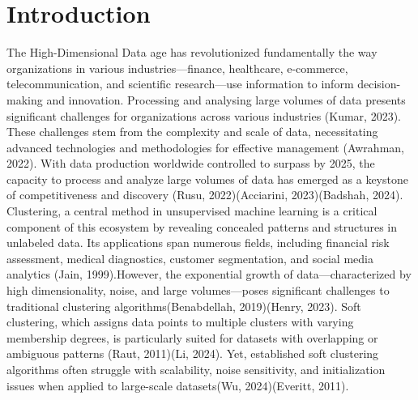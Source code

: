 \documentclass[twoside,11pt]{article}
\begin{document}
\section{Introduction}
The High-Dimensional Data age has revolutionized fundamentally the way organizations in various industries—finance, healthcare, e-commerce, telecommunication, and scientific research—use information to inform decision-making and innovation. Processing and analysing large volumes of data presents significant challenges for organizations across various industries (Kumar, 2023). These challenges stem from the complexity and scale of data, necessitating advanced technologies and methodologies for effective management (Awrahman, 2022). With data production worldwide controlled to surpass by 2025, the capacity to process and analyze large volumes of data has emerged as a keystone of competitiveness and discovery (Rusu, 2022)(Acciarini, 2023)(Badshah, 2024). Clustering, a central method in unsupervised machine learning is a critical component of this ecosystem by revealing concealed patterns and structures in unlabeled data. Its applications span numerous fields, including financial risk assessment, medical diagnostics, customer segmentation, and social media analytics (Jain, 1999).However, the exponential growth of data—characterized by high dimensionality, noise, and large volumes—poses significant challenges to traditional clustering algorithms(Benabdellah, 2019)(Henry, 2023). Soft clustering, which assigns data points to multiple clusters with varying membership degrees, is particularly suited for datasets with overlapping or ambiguous patterns (Raut, 2011)(Li, 2024). Yet, established soft clustering algorithms often struggle with scalability, noise sensitivity, and initialization issues when applied to large-scale datasets(Wu, 2024)(Everitt, 2011).
\end{document}
